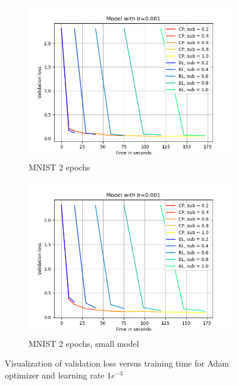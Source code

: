 \begin{figure}[h]
\begin{subfigure}[b]{0.24\textwidth}
        \centering
        \includegraphics[width=\textwidth]{figures/22_07/2ep/loss_time_0.001.png}
        \caption{MNIST 2 epochs}
        \label{fig:4c}
    \end{subfigure}
    \begin{subfigure}[b]{0.24\textwidth}
        \centering
        \includegraphics[width=\textwidth]{figures/22_07/2ep_smaller/loss_time_0.001.png}
        \caption{MNIST 2 epochs, small model}
        \label{fig:4d}
    \end{subfigure}
    \caption{Visualization of validation loss versus training time for Adam optimizer and learning rate $1e^{-3}$}
    \label{fig:three graphs}
\end{figure}


